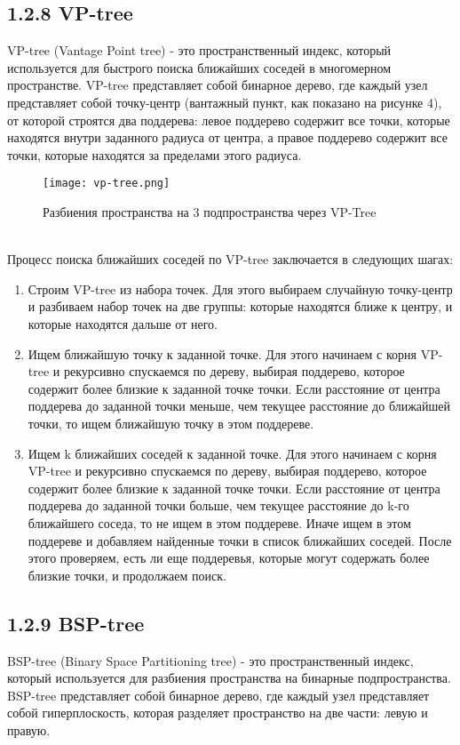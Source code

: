 \subsection{1.2.8 VP-tree}
VP-tree (Vantage Point tree) - это пространственный индекс, который используется для быстрого поиска ближайших соседей в многомерном пространстве. VP-tree представляет собой бинарное дерево, где каждый узел представляет собой точку-центр (вантажный пункт, как показано на рисунке 4), от которой строятся два поддерева: левое поддерево содержит все точки, которые находятся внутри заданного радиуса от центра, а правое поддерево содержит все точки, которые находятся за пределами этого радиуса.
  \\
\begin{figure}[h]
    \centering
    \texttt{[image: vp-tree.png]}
    \caption{Разбиения пространства на 3 подпространства через VP-Tree}
\end{figure}
  \\
Процесс поиска ближайших соседей по VP-tree заключается в следующих шагах:

\begin{enumerate}
    \item Строим VP-tree из набора точек. Для этого выбираем случайную точку-центр и разбиваем набор точек на две группы: которые находятся ближе к центру, и которые находятся дальше от него.
    \item Ищем ближайшую точку к заданной точке. Для этого начинаем с корня VP-tree и рекурсивно спускаемся по дереву, выбирая поддерево, которое содержит более близкие к заданной точке точки. Если расстояние от центра поддерева до заданной точки меньше, чем текущее расстояние до ближайшей точки, то ищем ближайшую точку в этом поддереве.
    \item Ищем k ближайших соседей к заданной точке. Для этого начинаем с корня VP-tree и рекурсивно спускаемся по дереву, выбирая поддерево, которое содержит более близкие к заданной точке точки. Если расстояние от центра поддерева до заданной точки больше, чем текущее расстояние до k-го ближайшего соседа, то не ищем в этом поддереве. Иначе ищем в этом поддереве и добавляем найденные точки в список ближайших соседей. После этого проверяем, есть ли еще поддеревья, которые могут содержать более близкие точки, и продолжаем поиск.
\end{enumerate}


\subsection{1.2.9 BSP-tree}
BSP-tree (Binary Space Partitioning tree) - это пространственный индекс, который используется для разбиения пространства на бинарные подпространства. BSP-tree представляет собой бинарное дерево, где каждый узел представляет собой гиперплоскость, которая разделяет пространство на две части: левую и правую.

